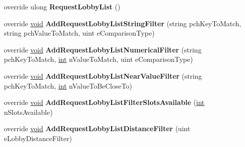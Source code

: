\begin{DoxyCompactItemize}
\item 
\hypertarget{classValve_1_1Steamworks_1_1CSteamMatchmaking_a7cacc41851214511e6fb55100d1d52c2}{}override ulong {\bfseries Request\+Lobby\+List} ()\label{classValve_1_1Steamworks_1_1CSteamMatchmaking_a7cacc41851214511e6fb55100d1d52c2}

\item 
\hypertarget{classValve_1_1Steamworks_1_1CSteamMatchmaking_ad7bbabee0edfd9cd0631a5d21bff53c1}{}override \hyperlink{SDL__audio_8h_a52835ae37c4bb905b903cbaf5d04b05f}{void} {\bfseries Add\+Request\+Lobby\+List\+String\+Filter} (string pch\+Key\+To\+Match, string pch\+Value\+To\+Match, uint e\+Comparison\+Type)\label{classValve_1_1Steamworks_1_1CSteamMatchmaking_ad7bbabee0edfd9cd0631a5d21bff53c1}

\item 
\hypertarget{classValve_1_1Steamworks_1_1CSteamMatchmaking_a59b39c7e0dccdacb357d09286905af50}{}override \hyperlink{SDL__audio_8h_a52835ae37c4bb905b903cbaf5d04b05f}{void} {\bfseries Add\+Request\+Lobby\+List\+Numerical\+Filter} (string pch\+Key\+To\+Match, \hyperlink{SDL__thread_8h_a6a64f9be4433e4de6e2f2f548cf3c08e}{int} n\+Value\+To\+Match, uint e\+Comparison\+Type)\label{classValve_1_1Steamworks_1_1CSteamMatchmaking_a59b39c7e0dccdacb357d09286905af50}

\item 
\hypertarget{classValve_1_1Steamworks_1_1CSteamMatchmaking_a1b583e949a25268e83ce7d26db7792cd}{}override \hyperlink{SDL__audio_8h_a52835ae37c4bb905b903cbaf5d04b05f}{void} {\bfseries Add\+Request\+Lobby\+List\+Near\+Value\+Filter} (string pch\+Key\+To\+Match, \hyperlink{SDL__thread_8h_a6a64f9be4433e4de6e2f2f548cf3c08e}{int} n\+Value\+To\+Be\+Close\+To)\label{classValve_1_1Steamworks_1_1CSteamMatchmaking_a1b583e949a25268e83ce7d26db7792cd}

\item 
\hypertarget{classValve_1_1Steamworks_1_1CSteamMatchmaking_aaf82e555d8886af4338b76b3cadc5725}{}override \hyperlink{SDL__audio_8h_a52835ae37c4bb905b903cbaf5d04b05f}{void} {\bfseries Add\+Request\+Lobby\+List\+Filter\+Slots\+Available} (\hyperlink{SDL__thread_8h_a6a64f9be4433e4de6e2f2f548cf3c08e}{int} n\+Slots\+Available)\label{classValve_1_1Steamworks_1_1CSteamMatchmaking_aaf82e555d8886af4338b76b3cadc5725}

\item 
\hypertarget{classValve_1_1Steamworks_1_1CSteamMatchmaking_ab86c22e70d152c56420ab8756550211a}{}override \hyperlink{SDL__audio_8h_a52835ae37c4bb905b903cbaf5d04b05f}{void} {\bfseries Add\+Request\+Lobby\+List\+Distance\+Filter} (uint e\+Lobby\+Distance\+Filter)\label{classValve_1_1Steamworks_1_1CSteamMatchmaking_ab86c22e70d152c56420ab8756550211a}


\end{DoxyCompactItemize}
